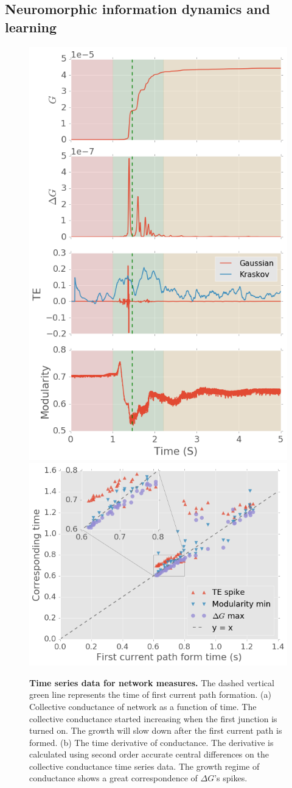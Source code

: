 \documentclass[fleqn,10pt,  reprint, amsmath,amssymb,aps, floatfix]{wlscirep}
\begin{document}




\subsection*{Neuromorphic information dynamics and learning}

\begin{figure}
	\centering
	\includegraphics[width=0.3\linewidth]{figure/time_series}
	\includegraphics[width=0.6\linewidth]{figure/time_align}
	\caption{\textbf{Time series data for network measures.} The dashed vertical green line represents the 			time of first current path formation.
			\newline (a) Collective conductance of network as a function of time. The collective conductance started increasing when the first junction is turned on. The growth will slow down after the first current path is formed.
			\newline (b) The time derivative of conductance. The derivative is calculated using second order accurate central differences on the collective conductance time series data. The growth regime of conductance shows a great correspondence of $\Delta G$'s spikes.
}
\end{figure}
\end{document}
